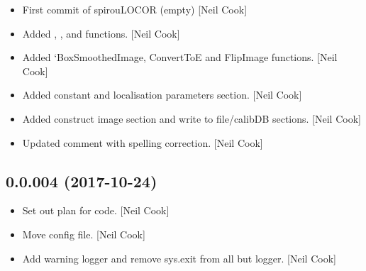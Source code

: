 \documentclass[a4paper,10pt,english]{report}
\begin{document}
\begin{itemize}
\item {} 
First commit of spirouLOCOR (empty) {[}Neil Cook{]}

\item {} 
Added , , and  functions.
{[}Neil Cook{]}

\item {} 
Added ‘BoxSmoothedImage, ConvertToE and FlipImage functions. {[}Neil
Cook{]}

\item {} 
Added  constant and localisation parameters section. {[}Neil
Cook{]}

\item {} 
Added construct image  section and write  to
file/calibDB sections. {[}Neil Cook{]}

\item {} 
Updated comment with spelling correction. {[}Neil Cook{]}

\end{itemize}


\subsection{0.0.004 (2017-10-24)}
\label{\detokenize{misc/changelog:id546}}\begin{itemize}
\item {} 
Set out plan for code. {[}Neil Cook{]}

\item {} 
Move config file. {[}Neil Cook{]}

\item {} 
Add warning logger and remove sys.exit from all but logger. {[}Neil
Cook{]}

\end{itemize}
\end{document}
